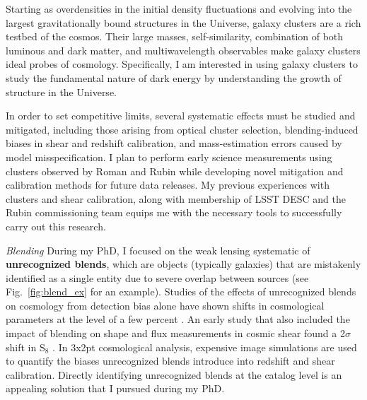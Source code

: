 \documentclass[11pt]{article}
\begin{document}
\pagestyle{fancy}

\indent \indent Starting as overdensities in the initial density fluctuations and evolving into the largest gravitationally bound structures in the Universe, galaxy clusters are a rich testbed of the cosmos.
Their large masses, self-similarity, combination of both luminous and dark matter, and multiwavelength observables make galaxy clusters ideal probes of cosmology. 
Specifically, I am interested in using galaxy clusters to study the fundamental nature of dark energy by understanding the growth of structure in the Universe.

In order to set competitive limits, several systematic effects must be studied and mitigated, including those arising from optical cluster selection, blending-induced biases in shear and redshift calibration, and mass-estimation errors caused by model misspecification.
I plan to perform early science measurements using clusters observed by Roman and Rubin while developing novel mitigation and calibration methods for future data releases.
My previous experiences with clusters and shear calibration, along with membership of LSST DESC and the Rubin commissioning team equips me with the necessary tools to successfully carry out this research.

\textit{Blending} During my PhD, I focused on the weak lensing systematic of \textbf{unrecognized blends}, which are objects (typically galaxies) that are mistakenly identified as a single entity due to severe overlap between sources (see Fig.~\ref{fig:blend_ex} for an example).
Studies of the effects of unrecognized blends on cosmology from detection bias alone have shown shifts in cosmological parameters at the level of a few percent \cite{ben_clustering, blends_2011, kidsblends_2025}.
An early study that also included the impact of blending on shape and flux measurements in cosmic shear found a 2$\sigma$ shift in S$_8$ \cite{erfan}.
In 3x2pt cosmological analysis, expensive image simulations are used to quantify the biases unrecognized blends introduce into redshift and shear calibration.
Directly identifying unrecognized blends at the catalog level is an appealing solution that I pursued during my PhD.
\end{document}
